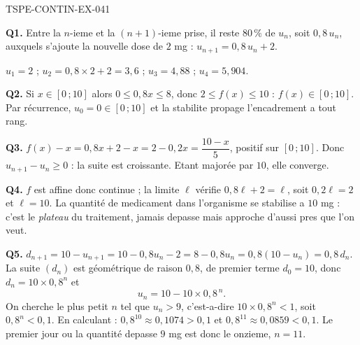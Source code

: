 \begin{corrige}{TSPE-CONTIN-EX-041}

\textbf{Q1.} Entre la $n$-ieme et la $(n+1)$-ieme prise, il reste $80\,\%$ de $u_n$, soit $0{,}8\,u_n$, auxquels s'ajoute la nouvelle dose de $2$ mg : $u_{n+1} = 0{,}8\,u_n + 2$.

$u_1 = 2$ ; $u_2 = 0{,}8 \times 2 + 2 = 3{,}6$ ; $u_3 = 4{,}88$ ; $u_4 = 5{,}904$.

\textbf{Q2.} Si $x \in [0\,;10]$ alors $0 \leq 0{,}8x \leq 8$, donc $2 \leq f(x) \leq 10$ : $f(x) \in [0\,;10]$. Par récurrence, $u_0 = 0 \in [0\,;10]$ et la stabilite propage l'encadrement a tout rang.

\textbf{Q3.} $f(x) - x = 0{,}8x + 2 - x = 2 - 0{,}2x = \dfrac{10-x}{5}$, positif sur $[0\,;10]$. Donc $u_{n+1} - u_n \geq 0$ : la suite est croissante. Etant majorée par $10$, elle converge.

\textbf{Q4.} $f$ est affine donc continue ; la limite $\ell$ vérifie $0{,}8\ell + 2 = \ell$, soit $0{,}2\ell = 2$ et $\ell = 10$. La quantité de medicament dans l'organisme se stabilise a $10$ mg : c'est le \emph{plateau} du traitement, jamais depasse mais approche d'aussi pres que l'on veut.

\textbf{Q5.} $d_{n+1} = 10 - u_{n+1} = 10 - 0{,}8u_n - 2 = 8 - 0{,}8u_n = 0{,}8(10 - u_n) = 0{,}8\,d_n$. La suite $(d_n)$ est géométrique de raison $0{,}8$, de premier terme $d_0 = 10$, donc $d_n = 10 \times 0{,}8^n$ et
\[ u_n = 10 - 10 \times 0{,}8^{\,n}. \]
On cherche le plus petit $n$ tel que $u_n > 9$, c'est-a-dire $10 \times 0{,}8^n < 1$, soit $0{,}8^n < 0{,}1$. En calculant : $0{,}8^{10} \approx 0{,}1074 > 0{,}1$ et $0{,}8^{11} \approx 0{,}0859 < 0{,}1$. Le premier jour ou la quantité depasse $9$ mg est donc le onzieme, $n = 11$.
\end{corrige}
